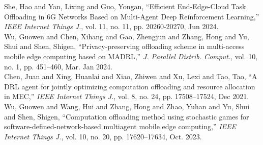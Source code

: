 \documentclass[12pt,draftclsnofoot,onecolumn]{IEEEtran}
\newenvironment{my}[2]%
{\begin{list}{}%
{\setlength{\rightmargin}{#1}\setlength{\leftmargin}{#2}}%


 \item[]{}

} {\end{list}}
\begin{document}
\begin{enumerate}
\begin{my}{1cm}{1cm}
{{			\cite{she2024efficient} She, Hao and Yan, Lixing and Guo, Yongan, ``Efficient End-Edge-Cloud Task Offloading in 6G Networks Based on Multi-Agent Deep Reinforcement Learning,'' \textit{IEEE Internet Things J.}, vol. 11, no. 11, pp. 20260-20270, Jun 2024.\\[6pt]
			\cite{wu2024privacy} Wu, Guowen and Chen, Xihang and Gao, Zhengjun and Zhang, Hong and Yu, Shui and Shen, Shigen, ``Privacy-preserving offloading scheme in multi-access mobile edge computing based on MADRL,'' \textit{J. Parallel Distrib. Comput.}, vol. 10, no. 1, pp. 451--460, Mar. Jan 2024.\\[6pt]			
			\cite{chen2021drl} Chen, Juan and Xing, Huanlai and Xiao, Zhiwen and Xu, Lexi and Tao, Tao, ``A DRL agent for jointly optimizing computation offloading and resource allocation in MEC,'' \textit{IEEE Internet Things J.}, vol. 8, no. 24, pp. 17508--17524, Dec 2021.\\[6pt]
			\cite{wu2023computation} Wu, Guowen and Wang, Hui and Zhang, Hong and Zhao, Yuhan and Yu, Shui and Shen, Shigen, ``Computation offloading method using stochastic games for software-defined-network-based multiagent mobile edge computing,'' \textit{IEEE Internet Things J.}, vol. 10, no. 20, pp. 17620–17634, Oct. 2023.\\[6pt]




}}
\end{my}


\end{enumerate}
\end{document}

